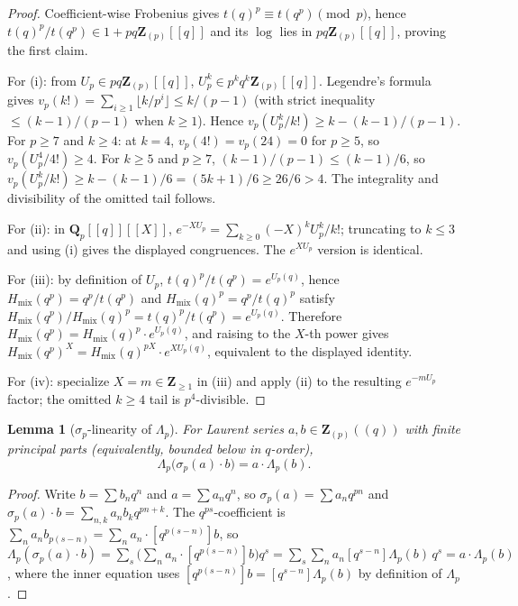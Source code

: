 \documentclass[11pt]{amsart}
\newtheorem{lemma}[theorem]{Lemma}
\theoremstyle{definition}
\theoremstyle{remark}
\newcommand{\Q}{\mathbf{Q}}
\newcommand{\Z}{\mathbf{Z}}
\begin{document}
\begin{proof}
Coefficient-wise Frobenius gives $t(q)^p\equiv t(q^p)\pmod p$, hence $t(q)^p/t(q^p)\in 1+pq\Z_{(p)}[[q]]$ and its $\log$ lies in $pq\Z_{(p)}[[q]]$, proving the first claim.

For (i): from $U_p\in pq\Z_{(p)}[[q]]$, $U_p^k\in p^kq^k\Z_{(p)}[[q]]$. Legendre's formula gives $v_p(k!)=\sum_{i\ge 1}\lfloor k/p^i\rfloor\le k/(p-1)$ (with strict inequality $\le (k-1)/(p-1)$ when $k\ge 1$). Hence $v_p(U_p^k/k!)\ge k-(k-1)/(p-1)$. For $p\ge 7$ and $k\ge 4$: at $k=4$, $v_p(4!)=v_p(24)=0$ for $p\ge 5$, so $v_p(U_p^4/4!)\ge 4$. For $k\ge 5$ and $p\ge 7$, $(k-1)/(p-1)\le (k-1)/6$, so $v_p(U_p^k/k!)\ge k-(k-1)/6=(5k+1)/6\ge 26/6>4$. The integrality and divisibility of the omitted tail follows.

For (ii): in $\Q_p[[q]][[X]]$, $e^{-XU_p}=\sum_{k\ge 0}(-X)^kU_p^k/k!$; truncating to $k\le 3$ and using (i) gives the displayed congruences. The $e^{XU_p}$ version is identical.

For (iii): by definition of $U_p$, $t(q)^p/t(q^p)=e^{U_p(q)}$, hence $H_{\mathrm{mix}}(q^p)=q^p/t(q^p)$ and $H_{\mathrm{mix}}(q)^p=q^p/t(q)^p$ satisfy $H_{\mathrm{mix}}(q^p)/H_{\mathrm{mix}}(q)^p=t(q)^p/t(q^p)=e^{U_p(q)}$. Therefore $H_{\mathrm{mix}}(q^p)=H_{\mathrm{mix}}(q)^p\cdot e^{U_p(q)}$, and raising to the $X$-th power gives $H_{\mathrm{mix}}(q^p)^X=H_{\mathrm{mix}}(q)^{pX}\cdot e^{XU_p(q)}$, equivalent to the displayed identity.

For (iv): specialize $X=m\in\Z_{\ge 1}$ in (iii) and apply (ii) to the resulting $e^{-mU_p}$ factor; the omitted $k\ge 4$ tail is $p^4$-divisible.
\end{proof}

\begin{lemma}[$\sigma_p$-linearity of $\Lambda_p$]\label{lem:sigma-p-linearity}
For Laurent series $a,b\in\Z_{(p)}((q))$ with finite principal parts (equivalently, bounded below in $q$-order),
\[
\Lambda_p\bigl(\sigma_p(a)\cdot b\bigr)=a\cdot\Lambda_p(b).
\]
\end{lemma}

\begin{proof}
Write $b=\sum b_nq^n$ and $a=\sum a_nq^n$, so $\sigma_p(a)=\sum a_nq^{pn}$ and $\sigma_p(a)\cdot b=\sum_{n,k}a_nb_kq^{pn+k}$. The $q^{ps}$-coefficient is $\sum_{n}a_nb_{p(s-n)}=\sum_n a_n\cdot[q^{p(s-n)}]b$, so $\Lambda_p(\sigma_p(a)\cdot b)=\sum_s\bigl(\sum_n a_n\cdot[q^{p(s-n)}]b\bigr)q^s=\sum_s\sum_n a_n[q^{s-n}]\Lambda_p(b)\,q^s=a\cdot\Lambda_p(b)$, where the inner equation uses $[q^{p(s-n)}]b=[q^{s-n}]\Lambda_p(b)$ by definition of $\Lambda_p$.
\end{proof}
\end{document}
